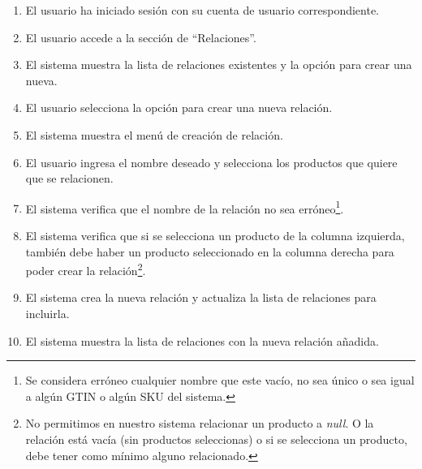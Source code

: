 \begin{enumerate}
    \item El usuario ha iniciado sesión con su cuenta de usuario correspondiente.
    \item El usuario accede a la sección de \enquote{Relaciones}.
    \item El sistema muestra la lista de relaciones existentes y la opción para crear una nueva.
    \item El usuario selecciona la opción para crear una nueva relación.
    \item El sistema muestra el menú de creación de relación.
    \item El usuario ingresa el nombre deseado y selecciona los productos que quiere que se relacionen.
    \item El sistema verifica que el nombre de la relación no sea erróneo\footnote{Se considera erróneo cualquier nombre que este vacío, no sea único o sea igual a algún GTIN o algún SKU del sistema.}.
    \item El sistema verifica que si se selecciona un producto de la columna izquierda, también debe haber un producto seleccionado en la columna derecha para poder crear la relación\footnote{No permitimos en nuestro sistema relacionar un producto a \emph{null}. O la relación está vacía (sin productos seleccionas) o si se selecciona un producto, debe tener como mínimo alguno relacionado.}.
    \item El sistema crea la nueva relación y actualiza la lista de relaciones para incluirla.
    \item El sistema muestra la lista de relaciones con la nueva relación añadida.
\end{enumerate}

